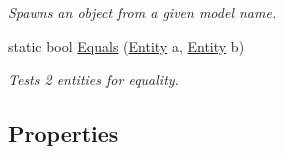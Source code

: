 \begin{DoxyCompactItemize}
\begin{DoxyCompactList}\small\item\em Spawns an object from a given model name. \end{DoxyCompactList}\item 
static bool \mbox{\hyperlink{class_lua_1_1_entity_ac55e7536a3bdc7a6b9a3fa6a759db9ee}{Equals}} (\mbox{\hyperlink{class_lua_1_1_entity}{Entity}} a, \mbox{\hyperlink{class_lua_1_1_entity}{Entity}} b)
\begin{DoxyCompactList}\small\item\em Tests 2 entities for equality. \end{DoxyCompactList}\end{DoxyCompactItemize}
\subsection*{Properties}
